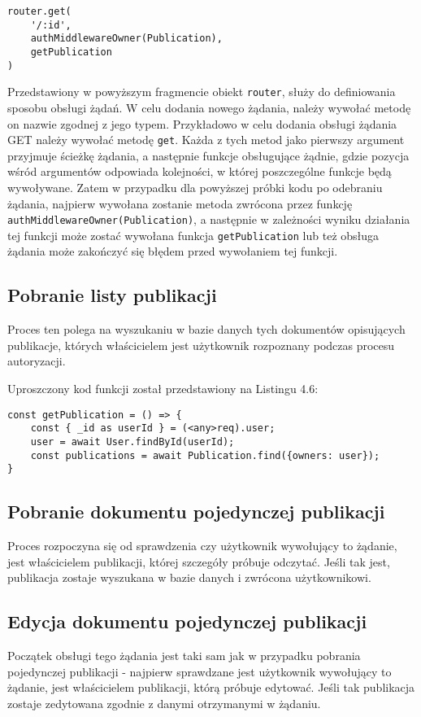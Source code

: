 \documentclass[a4paper,12pt,twoside,openany]{report}
\begin{document}
\begin{lstlisting}[caption=Deklaracja obsługi żądania,label=code1,captionpos=b]
router.get(
	'/:id', 
	authMiddlewareOwner(Publication), 
	getPublication
)
\end{lstlisting}
Przedstawiony w powyższym fragmencie obiekt \verb|router|, służy do definiowania sposobu obsługi żądań. W celu dodania nowego żądania, należy wywołać metodę on nazwie zgodnej z jego typem. Przykładowo w celu dodania obsługi żądania GET należy wywołać metodę \verb|get|. Każda z tych metod jako pierwszy argument przyjmuje ścieżkę żądania, a następnie funkcje obsługujące żądnie, gdzie pozycja wśród argumentów odpowiada kolejności, w której poszczególne funkcje będą wywoływane. Zatem w przypadku dla powyższej próbki kodu po odebraniu żądania, najpierw wywołana zostanie metoda zwrócona przez funkcję \verb|authMiddlewareOwner(Publication)|, a następnie w zależności wyniku działania tej funkcji może zostać wywołana funkcja \verb|getPublication| lub też obsługa żądania może zakończyć się błędem przed wywołaniem tej funkcji.


\subsection{Pobranie listy publikacji}
Proces ten polega na wyszukaniu w bazie danych tych dokumentów opisujących publikacje, których właścicielem jest użytkownik rozpoznany podczas procesu autoryzacji.
\pagebreak

Uproszczony kod funkcji został przedstawiony na Listingu 4.6:
\begin{lstlisting}[caption=Funkcja getPublication,label=code1,captionpos=b]
const getPublication = () => {
	const { _id as userId } = (<any>req).user;
	user = await User.findById(userId);
	const publications = await Publication.find({owners: user});
}
\end{lstlisting}
\subsection{Pobranie dokumentu pojedynczej publikacji}
Proces rozpoczyna się od sprawdzenia czy użytkownik wywołujący to żądanie, jest właścicielem publikacji, której szczegóły próbuje odczytać. Jeśli tak jest, publikacja zostaje wyszukana w bazie danych i zwrócona użytkownikowi.

\subsection{Edycja dokumentu pojedynczej publikacji}
Początek obsługi tego żądania jest taki sam jak w przypadku pobrania pojedynczej publikacji - najpierw sprawdzane jest użytkownik wywołujący to żądanie, jest właścicielem publikacji, którą próbuje edytować. Jeśli tak publikacja zostaje zedytowana zgodnie z danymi otrzymanymi w żądaniu.
\end{document}
